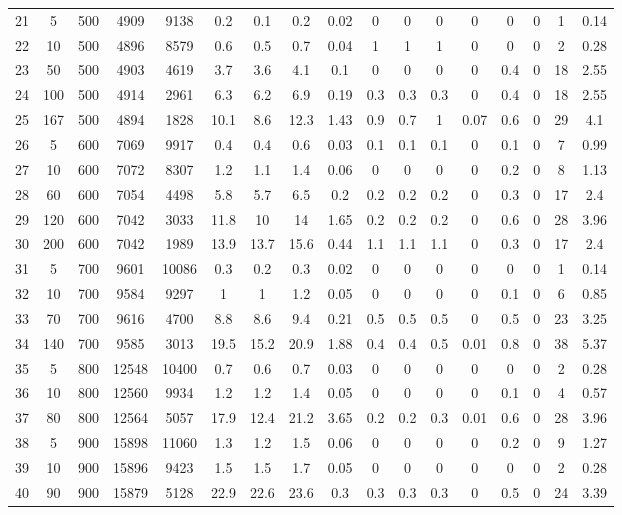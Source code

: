 \documentclass[11pt]{article}
\begin{document}
\begin{appendices}
\begin{landscape}
\begin{longtable}[c]{ccccc|cccc|cccc|cccc}
				\rowcolor[HTML]{EFEFEF} 
				21 & 5 & 500 & 4909 & 9138 & 0.2 & 0.1 & 0.2 & 0.02 & 0 & 0 & 0 & 0 & 0 & 0 & 1 & 0.14 \\
				\rowcolor[HTML]{EFEFEF} 
				22 & 10 & 500 & 4896 & 8579 & 0.6 & 0.5 & 0.7 & 0.04 & 1 & 1 & 1 & 0 & 0 & 0 & 2 & 0.28 \\
				\rowcolor[HTML]{EFEFEF} 
				23 & 50 & 500 & 4903 & 4619 & 3.7 & 3.6 & 4.1 & 0.1 & 0 & 0 & 0 & 0 & 0.4 & 0 & 18 & 2.55 \\
				\rowcolor[HTML]{EFEFEF} 
				24 & 100 & 500 & 4914 & 2961 & 6.3 & 6.2 & 6.9 & 0.19 & 0.3 & 0.3 & 0.3 & 0 & 0.4 & 0 & 18 & 2.55 \\
				\rowcolor[HTML]{EFEFEF} 
				25 & 167 & 500 & 4894 & 1828 & 10.1 & 8.6 & 12.3 & 1.43 & 0.9 & 0.7 & 1 & 0.07 & 0.6 & 0 & 29 & 4.1 \\
				26 & 5 & 600 & 7069 & 9917 & 0.4 & 0.4 & 0.6 & 0.03 & 0.1 & 0.1 & 0.1 & 0 & 0.1 & 0 & 7 & 0.99 \\
				27 & 10 & 600 & 7072 & 8307 & 1.2 & 1.1 & 1.4 & 0.06 & 0 & 0 & 0 & 0 & 0.2 & 0 & 8 & 1.13 \\
				28 & 60 & 600 & 7054 & 4498 & 5.8 & 5.7 & 6.5 & 0.2 & 0.2 & 0.2 & 0.2 & 0 & 0.3 & 0 & 17 & 2.4 \\
				29 & 120 & 600 & 7042 & 3033 & 11.8 & 10 & 14 & 1.65 & 0.2 & 0.2 & 0.2 & 0 & 0.6 & 0 & 28 & 3.96 \\
				30 & 200 & 600 & 7042 & 1989 & 13.9 & 13.7 & 15.6 & 0.44 & 1.1 & 1.1 & 1.1 & 0 & 0.3 & 0 & 17 & 2.4 \\
				\rowcolor[HTML]{EFEFEF} 
				31 & 5 & 700 & 9601 & 10086 & 0.3 & 0.2 & 0.3 & 0.02 & 0 & 0 & 0 & 0 & 0 & 0 & 1 & 0.14 \\
				\rowcolor[HTML]{EFEFEF} 
				32 & 10 & 700 & 9584 & 9297 & 1 & 1 & 1.2 & 0.05 & 0 & 0 & 0 & 0 & 0.1 & 0 & 6 & 0.85 \\
				\rowcolor[HTML]{EFEFEF} 
				33 & 70 & 700 & 9616 & 4700 & 8.8 & 8.6 & 9.4 & 0.21 & 0.5 & 0.5 & 0.5 & 0 & 0.5 & 0 & 23 & 3.25 \\
				\rowcolor[HTML]{EFEFEF} 
				34 & 140 & 700 & 9585 & 3013 & 19.5 & 15.2 & 20.9 & 1.88 & 0.4 & 0.4 & 0.5 & 0.01 & 0.8 & 0 & 38 & 5.37 \\
				35 & 5 & 800 & 12548 & 10400 & 0.7 & 0.6 & 0.7 & 0.03 & 0 & 0 & 0 & 0 & 0 & 0 & 2 & 0.28 \\
				36 & 10 & 800 & 12560 & 9934 & 1.2 & 1.2 & 1.4 & 0.05 & 0 & 0 & 0 & 0 & 0.1 & 0 & 4 & 0.57 \\
				37 & 80 & 800 & 12564 & 5057 & 17.9 & 12.4 & 21.2 & 3.65 & 0.2 & 0.2 & 0.3 & 0.01 & 0.6 & 0 & 28 & 3.96 \\
				\rowcolor[HTML]{EFEFEF} 
				38 & 5 & 900 & 15898 & 11060 & 1.3 & 1.2 & 1.5 & 0.06 & 0 & 0 & 0 & 0 & 0.2 & 0 & 9 & 1.27 \\
				\rowcolor[HTML]{EFEFEF} 
				39 & 10 & 900 & 15896 & 9423 & 1.5 & 1.5 & 1.7 & 0.05 & 0 & 0 & 0 & 0 & 0 & 0 & 2 & 0.28 \\
				\rowcolor[HTML]{EFEFEF} 
				40 & 90 & 900 & 15879 & 5128 & 22.9 & 22.6 & 23.6 & 0.3 & 0.3 & 0.3 & 0.3 & 0 & 0.5 & 0 & 24 & 3.39
			\end{longtable}
		\end{landscape}
		

\end{appendices}
\end{document}
